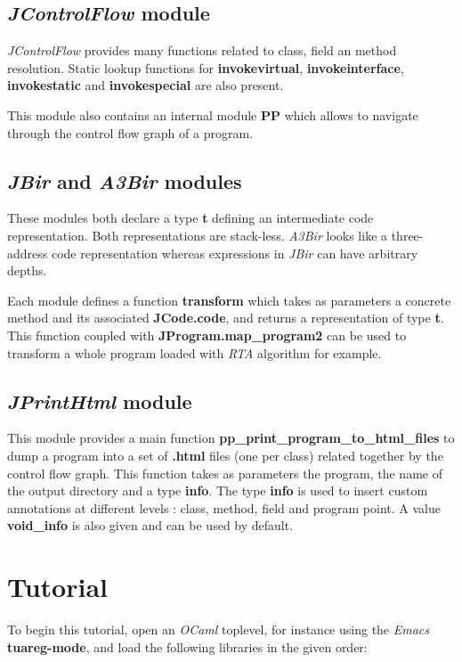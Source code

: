 \documentclass{article}
\begin{document}
\subsection{\emph{JControlFlow} module}

\emph{JControlFlow} provides many functions related to class, field
an method resolution. Static lookup functions for
\textbf{invokevirtual}, \textbf{invokeinterface},
\textbf{invokestatic} and \textbf{invokespecial} are also present.

This module also contains an internal module \textbf{PP} which
allows to navigate through the control flow graph of a program.

\subsection{\emph{JBir} and \emph{A3Bir} modules}

These modules both declare a type \textbf{t} defining an
intermediate code representation. Both representations are
stack-less. \emph{A3Bir} looks like a three-address code
representation whereas expressions in \emph{JBir} can have
arbitrary depths.

Each module defines a function \textbf{transform} which takes as
parameters a concrete method and its associated
\textbf{JCode.code}, and returns a representation of type
\textbf{t}. This function coupled with
\textbf{JProgram.map\_program2} can be used to transform a whole
program loaded with \emph{RTA} algorithm for example.

\subsection{\emph{JPrintHtml} module}

This module provides a main function
\textbf{pp\_print\_program\_to\_html\_files} to dump a program into
a set of \textbf{.html} files (one per class) related together by
the control flow graph. This function takes as parameters the
program, the name of the output directory and a type \textbf{info}.
The type \textbf{info} is used to insert custom annotations at
different levels : class, method, field and program point. A value
\textbf{void\_info} is also given and can be used by default.

\section{Tutorial}

To begin this tutorial, open an \emph{OCaml} toplevel, for instance
using the \emph{Emacs} \textbf{tuareg-mode}, and load the following
libraries in the given order:
\end{document}
